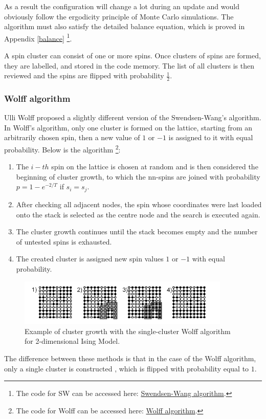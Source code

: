 As a result the configuration will change a lot during an update and would obviously follow the ergodicity principle of Monte Carlo simulations. The algorithm must also satisfy the detailed balance equation, which is proved in Appendix \ref{balance} \footnote{The code for SW can be accessed here: \href{https://github.com/artemstopnevich/Ising_Model_2D/blob/689a1759fd7a9aaacc71fcb317da944f78cce749/SwendsenWang/}{Swendsen-Wang algorithm}.}.

A spin cluster can consist of one or more spins. Once clusters of spins are formed, they are labelled, and stored in the code memory. The list of all clusters is then reviewed and the spins are flipped with probability $\frac{1}{2}$.

\subsubsection{Wolff algorithm \cite{Wolff}}

Ulli Wolff proposed a slightly different version of the Swendsen-Wang's algorithm. In Wolff's algorithm, only one cluster is formed on the lattice, starting from an arbitrarily chosen spin, then a new value of $1$ or $-1$ is assigned to it with equal probability. Below is the algorithm \footnote{The code for Wolff can be accessed here: \href{https://github.com/artemstopnevich/Ising_Model_2D/blob/689a1759fd7a9aaacc71fcb317da944f78cce749/Wolff/}{Wolff algorithm}.}:

\begin{enumerate}

	\item The $i-th$ spin on the lattice is chosen at random and is then considered the beginning of cluster growth, to which the nn-spins are joined with probability $p=1-e^{-2/T}$ if $s_i = s_j$. 
	\item After checking all adjacent nodes, the spin whose coordinates were last loaded onto the stack is selected as the centre node and the search is executed again.
	\item The cluster growth continues until the stack becomes empty and the number of untested spins is exhausted.
	
	\item The created cluster is assigned new spin values $1$ or $-1$ with equal probability.
\end{enumerate}

\begin{figure}[h!]
  \label{fig:Wolff}
  \includegraphics[width=0.9\textwidth]{figures/W_1.png}
  \centering
  \caption{Example of cluster growth with the single-cluster Wolff algorithm for 2-dimensional Ising Model.}
\end{figure}

The difference between these methods is that in the case of the Wolff algorithm, only a single cluster is constructed , which is flipped with probability equal to $1$.

